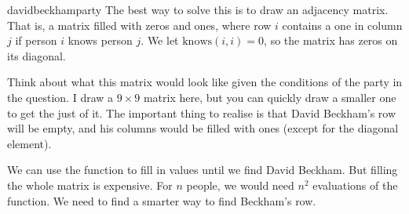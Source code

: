 \begin{answer}{davidbeckhamparty}
The best way to solve this is to draw an adjacency matrix.
That is, a matrix filled with zeros and ones, where
row $i$ contains a one in column $j$ if person $i$ knows person $j$.
We let $\text{knows}(i,i)=0$, so the matrix has zeros on its diagonal.

\begin{center}
\end{center}
Think about what this matrix would look like given the conditions of the party in the question.
I draw a $9 \times 9$ matrix here, but you can quickly draw a smaller one to get the just of it.
The important thing to realise is that David Beckham’s row will be empty, and his columns would be filled with ones (except for the diagonal element).
\begin{center}
\end{center}
We can use the function to fill in values until we find David Beckham.
But filling the whole matrix is expensive. For $n$ people, we would need $n^2$ evaluations of the function.
We need to find a smarter way to find Beckham's row.


\end{answer}
